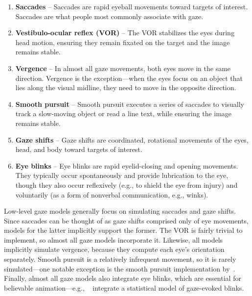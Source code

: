 \begin{enumerate}
\item \textbf{Saccades} -- Saccades are rapid eyeball movements toward targets of interest. Saccades are what people most commonly associate with gaze.
\item \textbf{Vestibulo-ocular reflex (VOR)} -- The VOR stabilizes the eyes during head motion, ensuring they remain fixated on the target and the image remains stable.
\item \textbf{Vergence} -- In almost all gaze movements, both eyes move in the same direction. Vergence is the exception---when the eyes focus on an object that lies along the visual midline, they need to move in the opposite direction.
\item \textbf{Smooth pursuit} -- Smooth pursuit executes a series of saccades to visually track a slow-moving object or read a line text, while ensuring the image remains stable.
\item \textbf{Gaze shifts} -- Gaze shifts are coordinated, rotational movements of the eyes, head, and body toward targets of interest.
\item \textbf{Eye blinks} -- Eye blinks are rapid eyelid-closing and opening movements. They typically occur spontaneously and provide lubrication to the eye, though they also occur reflexively (e.g., to shield the eye from injury) and voluntarily (as a form of nonverbal communication, e.g., winks).
\end{enumerate}

Low-level gaze models generally focus on simulating saccades and gaze shifts. Since saccades can be thought of as gaze shifts comprised only of eye movements, models for the latter implicitly support the former. The VOR is fairly trivial to implement, so almost all gaze models incorporate it. Likewise, all models implicitly simulate vergence, because they compute each eye's orientation separately. Smooth pursuit is a relatively infrequent movement, so it is rarely simulated---one notable exception is the smooth pursuit implementation by~\citet{yeo2012eyecatch}. Finally, almost all gaze models also integrate eye blinks, which are essential for believable animation---e.g., ~\citet{peters2010animating} integrate a statistical model of gaze-evoked blinks.

